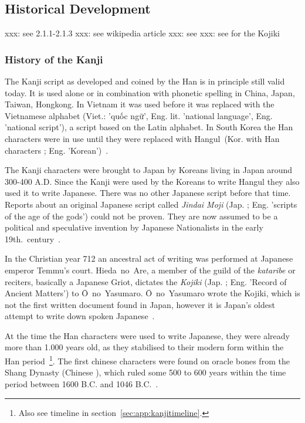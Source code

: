 \subsection{Historical Development}
\label{sec:historicaldevelopmentofjapanesescript}
xxx: see  2.1.1-2.1.3
xxx: see wikipedia article
xxx: see 
xxx: see  for the Kojiki

\subsubsection{History of the Kanji}
\label{sec:historyofthekanji}

The Kanji script as developed and coined by the Han is in principle still valid 
today. It is used alone or in combination with phonetic spelling in China, Japan,
Taiwan, Hongkong. In Vietnam it was used before it was replaced with the 
Vietnamese alphabet (Viet.: 'quốc ngữ', Eng. lit. 'national language', Eng. 
'national script'), a script based on the Latin alphabet. In South Korea the Han 
characters were in use until they were replaced with 
Hangul~(Kor. with Han characters ; Eng. 'Korean')~.

The Kanji characters were brought to Japan by Koreans living in Japan around 
300-400 A.D. Since the Kanji were used by the Koreans to write 
Hangul they also used it to write Japanese. There was no other Japanese script 
before that time. Reports about an original Japanese script called 
\emph{Jindai Moji} (Jap. ; Eng. 'scripts of the age of the gods')
could not be proven. They are now assumed to be a political and speculative 
invention by Japanese Nationalists in the early 
19th.~century~.

In the Christian year 712 an ancestral act of writing was performed at 
Japanese emperor Temmu's court. Hieda~no~Are, a member of the guild of the 
\emph{kataribe} or reciters, basically a Japanese Griot, dictates the 
\emph{Kojiki} (Jap. ; Eng. 'Record of Ancient Matters') to 
Ō~no~Yasumaro. Ō~no~Yasumaro wrote the Kojiki, which is not the first written 
document found in Japan, however it is Japan's oldest attempt to write down 
spoken Japanese~.

At the time the Han characters were used to write Japanese, they were already 
more than 1.000 years old, as they stabilised to their modern form within
the Han period~\footnote{Also see timeline in 
section~\ref{sec:app:kanjitimeline}.}.
The first chinese characters were found on oracle bones from the Shang Dynasty
(Chinese ), which ruled some 500 to 600 years within the time period 
between 1600 B.C. and 1046 B.C.~.

